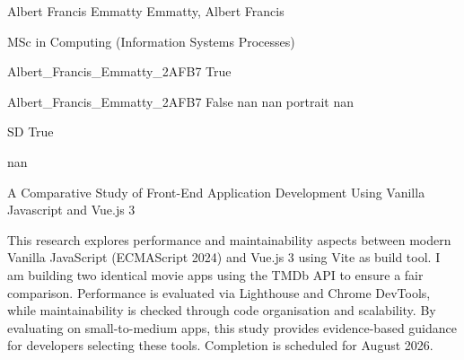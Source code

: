 
\begingroup{}\relax



\def\Key{Albert_Francis_Emmatty_2AFB7}

{Albert Francis Emmatty}
{Emmatty, Albert Francis}

{MSc in Computing (Information Systems Processes)}

{Albert_Francis_Emmatty_2AFB7}
{True}

{Albert_Francis_Emmatty_2AFB7}
{False}
{nan}
{nan}
{portrait}
{nan}

{SD}
{True}

{nan}

{A Comparative Study of Front-End Application Development Using Vanilla Javascript and Vue.js 3}

{This research explores performance and maintainability aspects between modern Vanilla JavaScript (ECMAScript 2024) and Vue.js 3 using Vite as build tool. I am building two identical movie apps using the TMDb API to ensure a fair comparison. Performance is evaluated via Lighthouse and Chrome DevTools, while maintainability is checked through code organisation and scalability. By evaluating on small-to-medium apps, this study provides evidence-based guidance for developers selecting these tools. Completion is scheduled for August 2026.}

